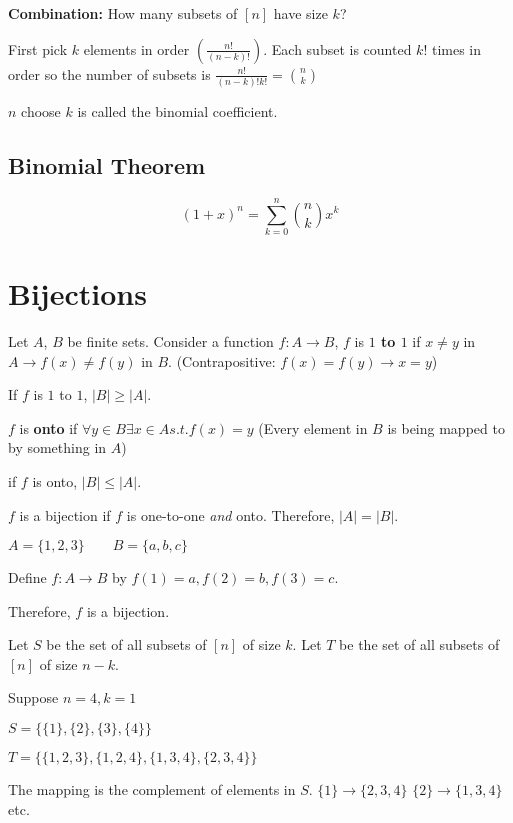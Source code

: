 \documentclass{article}
\begin{document}
\begin{defn}
	\textbf{Combination:}
	How many subsets of $[n]$ have size $k$?
\end{defn}


First pick $k$ elements in order $(\frac{n!}{(n-k)!})$. Each subset is counted $k!$ times in order so the number of subsets is $\frac{n!}{(n-k)!k!} = \binom nk$

$n$ choose $k$ is called the binomial coefficient.

\subsection{Binomial Theorem}
$$(1+x)^n = \sum_{k=0}^{n} \binom nk x^k$$


\section{Bijections}
\begin{defn}
Let $A$, $B$ be finite sets. Consider a function $f:A \rightarrow B$, $f$ is \textbf{$1$ to $1$} if $x\neq y$ in 
$A \rightarrow f(x) \neq f(y)$ in $B$. (Contrapositive: $f(x) = f(y) \rightarrow x=y$)
\end{defn}

If $f$ is $1$ to $1$, $|B| \geq |A|$.

\begin{defn}
$f$ is \textbf{onto} if $\forall y \in B \exists x \in A s.t. f(x) = y$  (Every element in $B$ is being mapped to by something in $A$)
\end{defn}

if $f$ is onto, $|B| \leq |A|$.

$f$ is a bijection if $f$ is one-to-one \emph{and} onto. Therefore, $|A| = |B|$.

\example
$A= \{1,2,3\} \qquad B= \{a,b,c\}$

Define $f:A \rightarrow B$ by $f(1)=a, f(2)=b, f(3)=c$.

Therefore, $f$ is a bijection.


\example
Let $S$ be the set of all subsets of $[n]$ of size $k$. Let $T$ be the set of all subsets of $[n]$ of size $n-k$.

Suppose $n=4, k = 1$

$S=\{ \{1\}, \{2\}, \{3\}, \{4\} \}$

$T=\{ \{1,2,3\}, \{1,2,4\}, \{1,3,4\}, \{2,3,4\} \}$

The mapping is the complement of elements in $S$.
$\{1\} \rightarrow \{2,3,4\}$
$\{2\} \rightarrow \{1,3,4\}$ etc.
\end{document}
